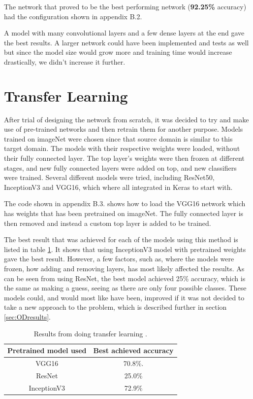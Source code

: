 The network that proved to be the best performing network (\textbf{92.25\%} accuracy) had the configuration shown in appendix B.2.

A model with many convolutional layers and a few dense layers at the end gave the best
results. A larger network could have been implemented and tests as well but
since the model size would grow more and training time would increase drastically,
we didn't increase it further.

\section{Transfer Learning}
\label{sec:NNtransfer}
After trial of designing the network from scratch, it was decided to try and make use of 
pre-trained networks and then retrain them for another purpose. Models trained on 
imageNet \cite{imageNet} were chosen since that source domain is similar to this target 
domain. The models with their respective weights were loaded, without their fully 
connected layer. The top layer's weights were then frozen at different stages, and new 
fully connected layers were added on top, and new classifiers were trained. 
Several different models were tried, including ResNet50, InceptionV3 and VGG16, 
which where all integrated in Keras to start with.

The code shown in appendix B.3. shows how to load the VGG16 network which has weights that has been pretrained on imageNet. The fully connected layer is then removed and instead a custom top layer is added to be trained.

The best result  that was achieved for each of the models using this method is listed in
 table \ref{table:transferLearning}. It shows that using InceptionV3 model with pretrained
 weights gave the best result. However, a few factors, such as, where the models were
 frozen, how adding and removing layers, has most likely affected the results. As can be
 seen from using ResNet, the best model achieved 25\% accuracy, which is the same as making a guess, seeing as there are only four possible classes. These models could, and would most like have been, improved if it was not decided to take a new approach to the problem, which is described further in section \ref{sec:ODresults}.

\begin{table}[h]
\centering
\begin{tabular}{ |c|c| } 
 \hline
 Pretrained model used &  Best achieved accuracy  \\ 
 \hline
 VGG16 & 70.8\%. \\ 
 \hline
 ResNet & 25.0\% \\ 
  \hline
 InceptionV3 & 72.9\% \\ 
 \hline
\end{tabular}
\caption{Results from doing transfer learning .}
\label{table:transferLearning}
\end{table}


\newpage